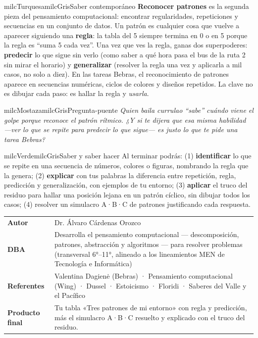 \documentclass[11pt,letterpaper]{article}
\begin{document}
\begin{softbox}{milcTurquesa}{milcGris}{Saber contemporáneo}
\textbf{Reconocer patrones} es la segunda pieza del pensamiento computacional: encontrar regularidades, repeticiones y secuencias en un conjunto de datos. Un patrón es cualquier cosa que vuelve a aparecer siguiendo una \textbf{regla}: la tabla del 5 siempre termina en 0 o en 5 porque la regla es ``suma 5 cada vez''. Una vez que ves la regla, ganas dos superpoderes: \textbf{predecir} lo que sigue sin verlo (como saber a qué hora pasa el bus de la ruta 2 sin mirar el horario) y \textbf{generalizar} (resolver la regla una vez y aplicarla a mil casos, no solo a diez). En las tareas Bebras, el reconocimiento de patrones aparece en secuencias numéricas, ciclos de colores y diseños repetidos. La clave no es dibujar cada paso: es hallar la regla y \emph{usarla}.
\end{softbox}

\begin{softbox}{milcMostaza}{milcGris}{Pregunta-puente}
\textit{Quien baila currulao ``sabe'' cuándo viene el golpe porque reconoce el patrón rítmico. ¿Y si te dijera que esa misma habilidad ---ver lo que se repite para predecir lo que sigue--- es justo lo que te pide una tarea Bebras?}
\end{softbox}

\begin{softbox}{milcVerde}{milcGris}{Saber y saber hacer}
Al terminar podrás: (1) \textbf{identificar} lo que se repite en una secuencia de números, colores o figuras, nombrando la regla que la genera; (2) \textbf{explicar} con tus palabras la diferencia entre repetición, regla, predicción y generalización, con ejemplos de tu entorno; (3) \textbf{aplicar} el truco del residuo para hallar una posición lejana en un patrón cíclico, sin dibujar todos los casos; (4) resolver un simulacro A·B·C de patrones justificando cada respuesta.
\end{softbox}



\small
\begin{tabularx}{\textwidth}{>{\bfseries}p{3.0cm}Y}
Autor & Dr. Álvaro Cárdenas Orozco\\
DBA & Desarrolla el pensamiento computacional --- descomposición, patrones, abstracción y algoritmos --- para resolver problemas (transversal 6°--11°, alineado a los lineamientos MEN de Tecnología e Informática)\\
Referentes & Valentina Dagienė (Bebras) · Pensamiento computacional (Wing) · Dussel · Estoicismo · Floridi · Saberes del Valle y el Pacífico\\
Producto final & Tu tabla «Tres patrones de mi entorno» con regla y predicción, más el simulacro A·B·C resuelto y explicado con el truco del residuo.\\
\end{tabularx}
\normalsize
\end{document}
